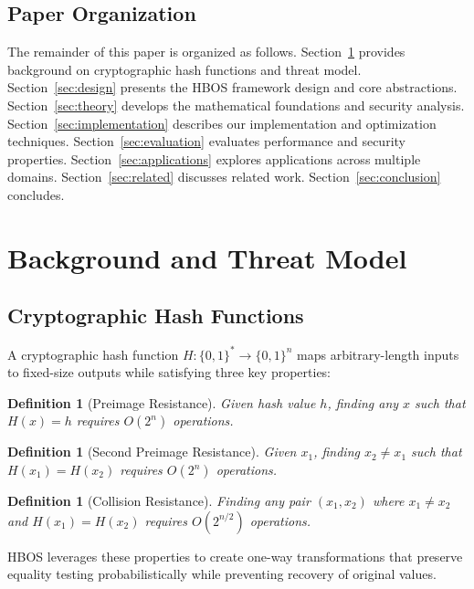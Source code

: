 \documentclass[10pt,conference]{IEEEtran}
\newtheorem{definition}[theorem]{Definition}
\begin{document}
\subsection{Paper Organization}

The remainder of this paper is organized as follows. Section~\ref{sec:background} provides background on cryptographic hash functions and threat model. Section~\ref{sec:design} presents the HBOS framework design and core abstractions. Section~\ref{sec:theory} develops the mathematical foundations and security analysis. Section~\ref{sec:implementation} describes our implementation and optimization techniques. Section~\ref{sec:evaluation} evaluates performance and security properties. Section~\ref{sec:applications} explores applications across multiple domains. Section~\ref{sec:related} discusses related work. Section~\ref{sec:conclusion} concludes.

\section{Background and Threat Model}
\label{sec:background}

\subsection{Cryptographic Hash Functions}

A cryptographic hash function $H: \{0,1\}^* \rightarrow \{0,1\}^n$ maps arbitrary-length inputs to fixed-size outputs while satisfying three key properties:

\begin{definition}[Preimage Resistance]
Given hash value $h$, finding any $x$ such that $H(x) = h$ requires $O(2^n)$ operations.
\end{definition}

\begin{definition}[Second Preimage Resistance]
Given $x_1$, finding $x_2 \neq x_1$ such that $H(x_1) = H(x_2)$ requires $O(2^n)$ operations.
\end{definition}

\begin{definition}[Collision Resistance]
Finding any pair $(x_1, x_2)$ where $x_1 \neq x_2$ and $H(x_1) = H(x_2)$ requires $O(2^{n/2})$ operations.
\end{definition}

HBOS leverages these properties to create one-way transformations that preserve equality testing probabilistically while preventing recovery of original values.
\end{document}
